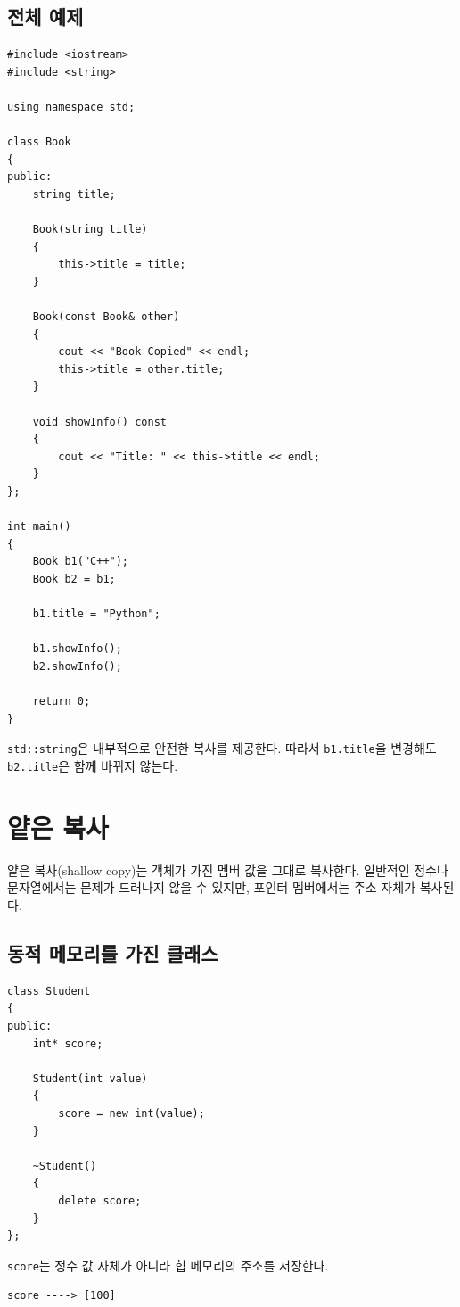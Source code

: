 \documentclass[11pt,a4paper]{article}
\begin{document}
\subsection{전체 예제}
\begin{lstlisting}
#include <iostream>
#include <string>

using namespace std;

class Book
{
public:
    string title;

    Book(string title)
    {
        this->title = title;
    }

    Book(const Book& other)
    {
        cout << "Book Copied" << endl;
        this->title = other.title;
    }

    void showInfo() const
    {
        cout << "Title: " << this->title << endl;
    }
};

int main()
{
    Book b1("C++");
    Book b2 = b1;

    b1.title = "Python";

    b1.showInfo();
    b2.showInfo();

    return 0;
}
\end{lstlisting}

\texttt{std::string}은 내부적으로 안전한 복사를 제공한다. 따라서 \texttt{b1.title}을 변경해도 \texttt{b2.title}은 함께 바뀌지 않는다.

\section{얕은 복사}
얕은 복사(shallow copy)는 객체가 가진 멤버 값을 그대로 복사한다. 일반적인 정수나 문자열에서는 문제가 드러나지 않을 수 있지만, 포인터 멤버에서는 주소 자체가 복사된다.

\subsection{동적 메모리를 가진 클래스}
\begin{lstlisting}
class Student
{
public:
    int* score;

    Student(int value)
    {
        score = new int(value);
    }

    ~Student()
    {
        delete score;
    }
};
\end{lstlisting}

\texttt{score}는 정수 값 자체가 아니라 힙 메모리의 주소를 저장한다.

\begin{verbatim}
score ----> [100]
\end{verbatim}
\end{document}

